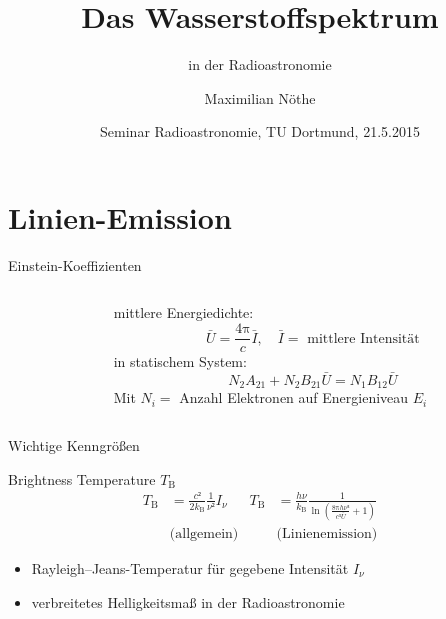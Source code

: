 \documentclass[compress, aspectratio=169]{beamer}
\author{Maximilian Nöthe}
\date[21.5.2015]{Seminar Radioastronomie, TU Dortmund, 21.5.2015}
\title{Das Wasserstoffspektrum}
\subtitle{in der Radioastronomie}
\newcommand\PI{\ensuremath{\mathup{π}}}
\newcommand\kb{\ensuremath{k_\mathup{B}}}
\newcommand\TB{\ensuremath{T_\mathup{B}}}
\begin{document}
\maketitle

\section{Linien-Emission}
\begin{frame}{Einstein-Koeffizienten}
  \begin{columns}[T, onlytextwidth]%
    \begin{column}{0.5\textwidth}%
    \end{column}%
    \begin{column}{0.45\textwidth}%
      mittlere Energiedichte:
      \begin{equation*}
        \bar{U} = \frac{4\PI}{c} \bar{I},\quad\text{$\bar{I} =$ mittlere Intensität}
      \end{equation*}
      in statischem System:
      \begin{equation*}
        N_2 A_{21} + N_2 B_{21} \bar{U} = N_1 B_{12} \bar{U}
      \end{equation*}
      Mit $N_i =$ Anzahl Elektronen auf Energieniveau $E_i$
    \end{column}%
  \end{columns}%
\end{frame}

\begin{frame}{Wichtige Kenngrößen}
  \begin{block}{Brightness Temperature $T_\mathup{B}$}
    \begin{align*}%
      \TB &= \frac{c²}{2 \kb} \frac{1}{ν²} I_ν & 
      \TB &= \frac{h ν}{k_\mathup{B}}
             \frac{1}{\ln\!\left(
                \frac{8\PI h ν³}{c³\bar{U}} + 1
             \right)} \\
      &\text{(allgemein)} &  &\text{(Linienemission)}
    \end{align*}%
  \begin{itemize}
    \item Rayleigh–Jeans-Temperatur für gegebene Intensität $I_ν$
    \item verbreitetes Helligkeitsmaß in der Radioastronomie
  \end{itemize}
  \end{block}%
\end{frame}
\end{document}
